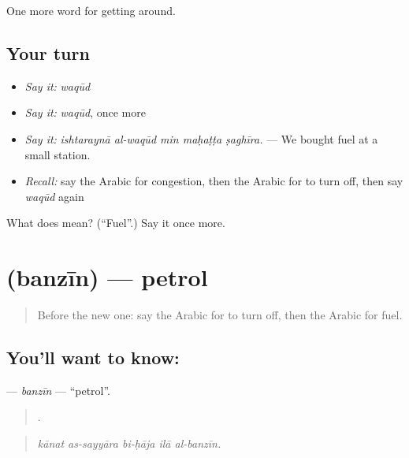 \begin{grammarlens}[title={What you've built}]
One more word for getting around.
\end{grammarlens}

\subsection*{Your turn}
\begin{itemize}
\raggedright
  \item \emph{Say it:} \emph{waqūd}
  \item \emph{Say it:} \emph{waqūd}, once more
  \item \emph{Say it:} \emph{ishtaraynā al-waqūd min maḥaṭṭa ṣaghīra.} — We bought fuel at a small station.
  \item \emph{Recall:} say the Arabic for congestion, then the Arabic for to turn off, then say \emph{waqūd} again
\end{itemize}

\begin{tcolorbox}[breakable,colback=teal!4,colframe=teal!35!black,title={Before you move on}]
What does  mean? (\textquotedblleft{}Fuel\textquotedblright{}.) Say it once more.
\end{tcolorbox}
\section[\texorpdfstring{\ar{بنزين} (banzīn)}{بنزين (banzīn)}]{ (banzīn) — petrol}

\label{lesson:AR-C432-banzin}



\begin{quote}
Before the new one: say the Arabic for to turn off, then the Arabic for fuel.
\end{quote}

\subsection*{You'll want to know: }
\textbf{} — \emph{banzīn} — \textquotedblleft{}petrol\textquotedblright{}.

\begin{quote}
    .
\end{quote}

\begin{quote}
\emph{kānat as-sayyāra bi-ḥāja ilā al-banzīn.}
\end{quote}

